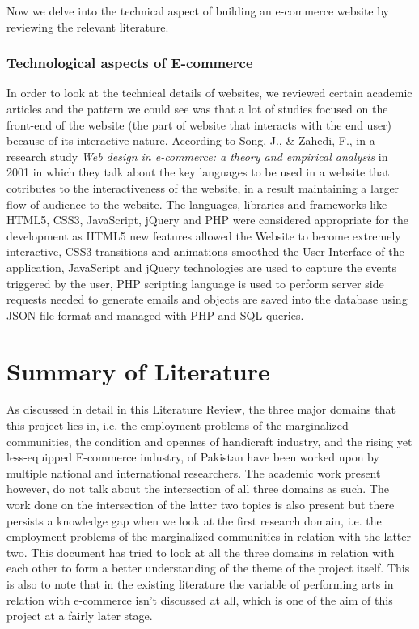 Now we delve into the technical aspect of building an e-commerce website by reviewing the relevant literature.

\subsubsection {Technological aspects of E-commerce}

In order to look at the technical details of websites, we reviewed certain academic articles and the pattern we could see was that a lot of studies focused on the front-end of the website (the part of website that interacts with the end user) because of its interactive nature. According to Song, J., \& Zahedi, F., in a research study \textit {Web design in e-commerce: a theory and empirical analysis} in 2001 in which they talk about the key languages to be used in a website that cotributes to the interactiveness of the website, in a result maintaining a larger flow of audience to the website. The languages, libraries and frameworks like HTML5, CSS3, JavaScript, jQuery and PHP were considered appropriate for the development as HTML5 new features allowed the Website to become extremely interactive, CSS3 transitions and animations smoothed the User Interface of the application, JavaScript and jQuery technologies are used to capture the events triggered by the user, PHP scripting language is used to perform server side requests needed to generate emails and objects are saved into the database using JSON file format and managed with PHP and SQL queries.



\section{Summary of Literature}

As discussed in detail in this Literature Review, the three major domains that this project lies in, i.e. the employment problems of the marginalized communities, the condition and opennes of handicraft industry, and the rising yet less-equipped E-commerce industry, of Pakistan have been worked upon by multiple national and international researchers. The academic work present however, do not talk about the intersection of all three domains as such. The work done on the intersection of the latter two topics is also present but there persists a knowledge gap when we look at the first research domain, i.e. the employment problems of the marginalized communities in relation with the latter two. This document has tried to look at all the three domains in relation with each other to form a better understanding of the theme of the project itself. This is also to note that in the existing literature the variable of performing arts in relation with e-commerce isn't discussed at all, which is one of the aim of this project at a fairly later stage. 

